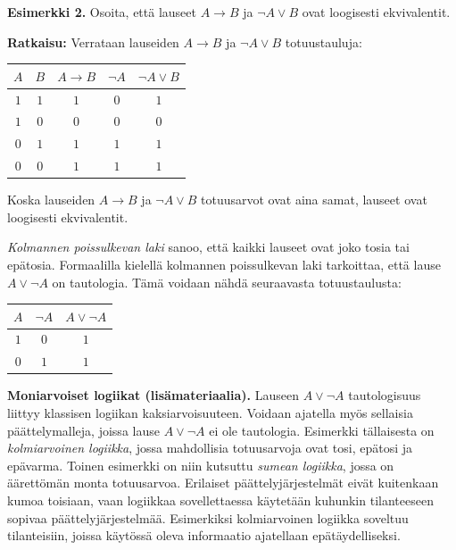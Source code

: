 {\bf Esimerkki 2.} Osoita, että lauseet $A\to B$ ja $\lnot A \lor B$ ovat loogisesti
ekvivalentit.

{\bf Ratkaisu:}
Verrataan lauseiden $A\to B$ ja $\lnot A \lor B$
totuustauluja: 

\begin{center}
\begin{tabular}{|c|c|c|c|c|}\hline
$A$ & $B$ & $A\to B$ & $\lnot A$ & $\lnot A\lor B$ \\ \hline
$1$ & $1$ & $1$ & $0$ & $1$  \\ %
$1$ & $0$ & $0$ & $0$ & $0$  \\
$0$ & $1$ & $1$ & $1$ & $1$  \\
$0$ & $0$ & $1$ & $1$ & $1$  \\ \hline
\end{tabular}
\end{center}

Koska lauseiden $A\to B$ ja $\lnot A \lor B$ totuusarvot
ovat aina samat, lauseet ovat loogisesti ekvivalentit.

{\em Kolmannen poissulkevan laki} sanoo, että kaikki lauseet ovat joko tosia tai epätosia. Formaalilla kielellä kolmannen poissulkevan laki tarkoittaa, että lause $A \lor \lnot A$ on tautologia. Tämä voidaan nähdä seuraavasta totuustaulusta:

\bigskip

\begin{center}
\begin{tabular}{|c|c|c|}\hline
$A$ & $\lnot A$ & $A \lor  \lnot A$ \\ \hline
$1$ & $0$ & $1$\\
$0$ & $1$ & $1$\\ \hline
\end{tabular}
\end{center}

\bigskip


{\bf Moniarvoiset logiikat (lisämateriaalia).}
Lauseen $A \lor \lnot A$ tautologisuus liittyy klassisen logiikan kaksiarvoisuuteen. Voidaan ajatella myös sellaisia päättelymalleja, joissa lause $A \lor \lnot A$ ei ole tautologia. Esimerkki tällaisesta on {\em kolmiarvoinen logiikka}, jossa mahdollisia totuusarvoja ovat tosi, epätosi ja epävarma.  Toinen esimerkki on niin kutsuttu {\em sumean logiikka}, jossa on äärettömän monta totuusarvoa. Erilaiset päättelyjärjestelmät eivät kuitenkaan kumoa toisiaan, vaan logiikkaa sovellettaessa käytetään kuhunkin tilanteeseen sopivaa päättelyjärjestelmää. Esimerkiksi kolmiarvoinen logiikka soveltuu tilanteisiin, joissa käytössä oleva informaatio ajatellaan epätäydelliseksi.

